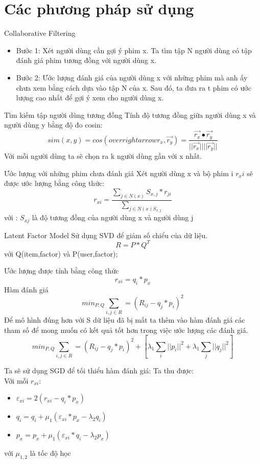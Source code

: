 \documentclass{beamer}
\begin{document}
\section{Các phương pháp sử dụng}

\begin{frame}{Collaborative Filtering}
\color{vhilight}{ Ý tưởng :}
\begin{itemize}
\item Bước 1: Xét người dùng cần gợi ý phim x. Ta tìm tập N người dùng có tập đánh giá phim tương đồng với người dùng x. 
\item Bước 2: Ước lượng đánh giá của người dùng x với những phim mà anh ấy chưa xem bằng cách dựa vào tập N của x. Sau đó, ta đưa ra t phim có ước lượng cao nhất để gợi ý xem cho người dùng x.
\end{itemize} 
\end{frame}
\begin{frame}{Tìm kiếm tập người dùng tương đồng}
Tính độ tương đồng giữa người dùng x và người dùng y bằng độ đo cosin:
$$sim(x,y)=cos(overrightarrow{r_x},\overrightarrow{r_y})=\dfrac{\overrightarrow{r_x}\bullet\overrightarrow{r_y}}{||\overrightarrow{r_x}||||\overrightarrow{r_y}||}$$
Với mỗi người dùng ta sẽ chọn ra k người dùng gần với x nhất. 
\end{frame}
\begin{frame}{Ước lượng với những phim chưa đánh giá}
Xét người dùng x và bộ phim i $r_xi$ sẽ được ước lượng bằng công thức: 
$$ r_{xi}=\dfrac{\sum_{j\in N(x)} S_{x,j} *r_{ji}}{\sum_{j\in N(x) S_{x,j}}}$$
với : $S_{xj}$ là độ tương đồng của người dùng x và người dùng j

\end{frame}
\begin{frame}{Latent Factor Model}
{\color{vhilight}{ Ý tưởng :}} 
Sử dụng SVD để giảm số chiểu của dữ liệu.
$$R=P*Q^T$$
với Q(item,factor) và P(user,factor);


Ước lượng được tính bằng công thức $$r_{xi}=q_i*p_x$$ 
Hàm đánh giá $$ min_{P,Q} \sum_{i,j\in R} = (R_{ij}-q_j*p_i)^2$$
Để mô hình đúng hơn với S dữ liệu đã bị mất ta thêm vào hàm đánh giá các tham số để mong muốn có kết quả tốt hơn trong việc ước lượng các đánh giá.
$$ min_{P,Q} \sum_{i,j\in R} = (R_{ij}-q_j*p_i)^2+[\lambda_1 \sum_i ||p_i||^2 +\lambda_1 \sum_j ||q_j||^2]$$

\end{frame}
\begin{frame}
Ta sẽ sử dụng SGD để tối thiểu hàm đánh giá:
Ta thu được: \\
Với mỗi $r_{xi}:$
\begin{itemize}
\item $\varepsilon_{xi} =2(r_{xi}-q_i*p_x)$
\item $q_i=q_i+\mu_1(\varepsilon_{xi}*p_x-\lambda_2q_i)$
\item $p_x=p_x+\mu_1(\varepsilon_{xi}*q_i-\lambda_2p_x)$

\end{itemize}
với $\mu_{1,2}$ là tốc độ học 
\end{frame}
\end{document}
